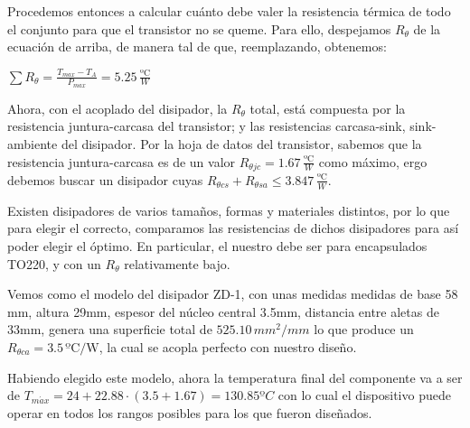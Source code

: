 \documentclass[e2_tp1_main.tex]{subfiles}
\begin{document}
Procedemos entonces a calcular cuánto debe valer la resistencia térmica
de todo el conjunto para que el transistor no se queme. Para ello,
despejamos $R_{\theta}$ de la ecuación de arriba, de manera tal de
que, reemplazando, obtenemos:
\begin{center}
{\large{}$\sum R_{\theta}=\frac{T_{max}-T_{A}}{P_{max}}=5.25\,\frac{\text{ºC}}{W}$}{\large\par}
\par\end{center}

Ahora, con el acoplado del disipador, la $R_{\theta}$ total, está
compuesta por la resistencia juntura-carcasa del transistor; y las
resistencias carcasa-sink, sink-ambiente del disipador. Por la hoja
de datos del transistor, sabemos que la resistencia juntura-carcasa
es de un valor $R_{\theta jc}=1.67\,\frac{\text{ºC}}{W}$ como máximo,
ergo debemos buscar un disipador cuyas $R_{\theta cs}+R_{\theta sa}\leq3.847\,\frac{\text{ºC}}{W}$.

Existen disipadores de varios tamaños, formas y materiales distintos,
por lo que para elegir el correcto, comparamos las resistencias de
dichos disipadores para así poder elegir el óptimo. En particular,
el nuestro debe ser para encapsulados TO220, y con un $R_{\theta}$
relativamente bajo.

Vemos como el modelo del disipador ZD-1, con unas medidas medidas
de base 58 mm, altura 29mm, espesor del núcleo central 3.5mm, distancia
entre aletas de 33mm, genera una superficie total de $525.10\,mm^{2}/mm$
lo que produce un $R_{\theta ca}=3.5\,\text{ºC/W}$, la cual se acopla
perfecto con nuestro diseño.

Habiendo elegido este modelo, ahora la temperatura final del componente
va a ser de $T_{m\acute{a}x}=24+22.88\cdot(3.5+1.67)=130.85ºC$
con lo cual el dispositivo puede operar en todos los rangos posibles
para los que fueron diseñados.
\end{document}
